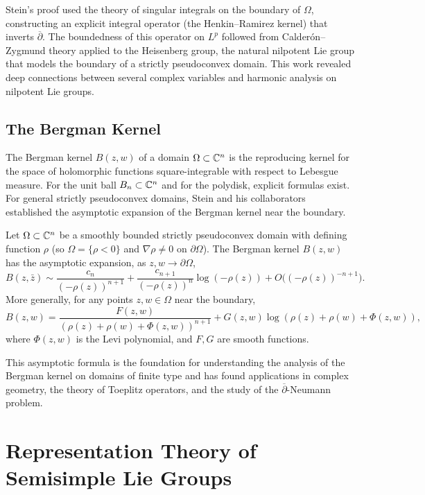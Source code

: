 Stein's proof used the theory of singular integrals on the boundary of \(\Omega\), constructing an explicit integral operator (the Henkin--Ramirez kernel) that inverts \(\overline{\partial}\). The boundedness of this operator on \(L^p\) followed from Calder\'on--Zygmund theory applied to the Heisenberg group, the natural nilpotent Lie group that models the boundary of a strictly pseudoconvex domain. This work revealed deep connections between several complex variables and harmonic analysis on nilpotent Lie groups.

\subsection{The Bergman Kernel}

The Bergman kernel \(B(z,w)\) of a domain \(\Omega \subset \mathbb{C}^n\) is the reproducing kernel for the space of holomorphic functions square-integrable with respect to Lebesgue measure. For the unit ball \(B_n \subset \mathbb{C}^n\) and for the polydisk, explicit formulas exist. For general strictly pseudoconvex domains, Stein and his collaborators established the asymptotic expansion of the Bergman kernel near the boundary.

\begin{theorem}
Let \(\Omega \subset \mathbb{C}^n\) be a smoothly bounded strictly pseudoconvex domain with defining function \(\rho\) (so \(\Omega = \{\rho < 0\}\) and \(\nabla\rho \neq 0\) on \(\partial\Omega\)). The Bergman kernel \(B(z,w)\) has the asymptotic expansion, as \(z,w \to \partial\Omega\),
\[
B(z,\bar{z}) \sim \frac{c_n}{(-\rho(z))^{n+1}} + \frac{c_{n+1}}{(-\rho(z))^{n}} \log(-\rho(z)) + O\big((-\rho(z))^{-n+1}\big).
\]
More generally, for any points \(z,w \in \Omega\) near the boundary,
\[
B(z,w) = \frac{F(z,w)}{(\rho(z) + \rho(w) + \Phi(z,w))^{n+1}} + G(z,w) \log(\rho(z) + \rho(w) + \Phi(z,w)),
\]
where \(\Phi(z,w)\) is the Levi polynomial, and \(F,G\) are smooth functions.
\end{theorem}

This asymptotic formula is the foundation for understanding the analysis of the Bergman kernel on domains of finite type and has found applications in complex geometry, the theory of Toeplitz operators, and the study of the \(\overline{\partial}\)-Neumann problem.

\section{Representation Theory of Semisimple Lie Groups}

